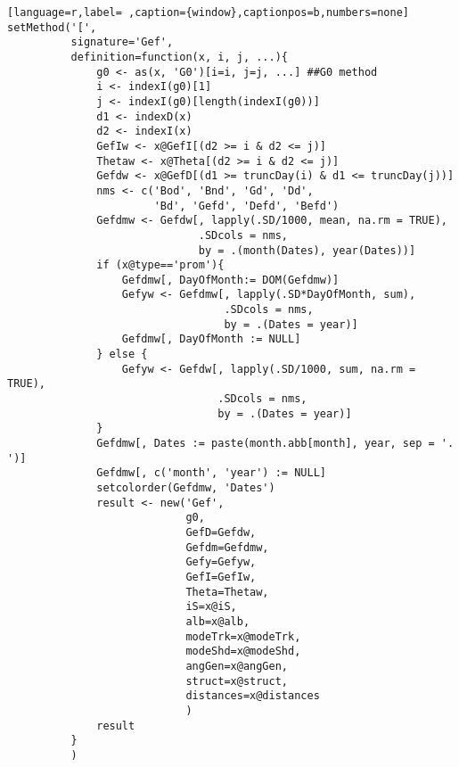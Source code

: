 \begin{lstlisting}[language=r,label= ,caption={window},captionpos=b,numbers=none]
setMethod('[',
          signature='Gef',
          definition=function(x, i, j, ...){
              g0 <- as(x, 'G0')[i=i, j=j, ...] ##G0 method
              i <- indexI(g0)[1]
              j <- indexI(g0)[length(indexI(g0))]
              d1 <- indexD(x)
              d2 <- indexI(x)
              GefIw <- x@GefI[(d2 >= i & d2 <= j)]
              Thetaw <- x@Theta[(d2 >= i & d2 <= j)]
              Gefdw <- x@GefD[(d1 >= truncDay(i) & d1 <= truncDay(j))]
              nms <- c('Bod', 'Bnd', 'Gd', 'Dd',
                       'Bd', 'Gefd', 'Defd', 'Befd')
              Gefdmw <- Gefdw[, lapply(.SD/1000, mean, na.rm = TRUE),
                              .SDcols = nms,
                              by = .(month(Dates), year(Dates))]
              if (x@type=='prom'){
                  Gefdmw[, DayOfMonth:= DOM(Gefdmw)]
                  Gefyw <- Gefdmw[, lapply(.SD*DayOfMonth, sum),
                                  .SDcols = nms,
                                  by = .(Dates = year)]
                  Gefdmw[, DayOfMonth := NULL]
              } else {
                  Gefyw <- Gefdw[, lapply(.SD/1000, sum, na.rm = TRUE),
                                 .SDcols = nms,
                                 by = .(Dates = year)]
              }
              Gefdmw[, Dates := paste(month.abb[month], year, sep = '. ')]
              Gefdmw[, c('month', 'year') := NULL]
              setcolorder(Gefdmw, 'Dates')
              result <- new('Gef',
                            g0,
                            GefD=Gefdw,
                            Gefdm=Gefdmw,
                            Gefy=Gefyw,
                            GefI=GefIw,
                            Theta=Thetaw,
                            iS=x@iS,
                            alb=x@alb,
                            modeTrk=x@modeTrk,
                            modeShd=x@modeShd,
                            angGen=x@angGen,
                            struct=x@struct,
                            distances=x@distances
                            )
              result
          }
          )



\end{lstlisting}
